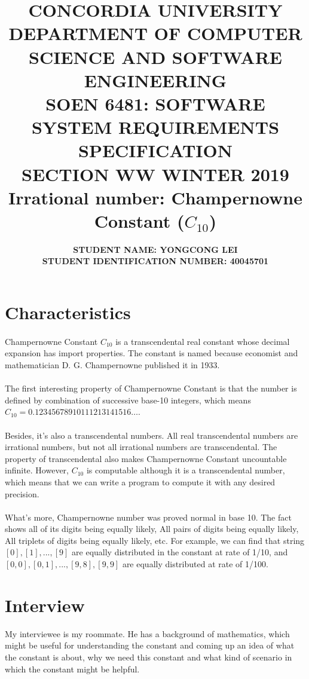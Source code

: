 \documentclass[10pt]{article}
\title{{\large \textbf{CONCORDIA UNIVERSITY \\ DEPARTMENT OF COMPUTER SCIENCE AND SOFTWARE ENGINEERING \\ SOEN 6481: SOFTWARE SYSTEM REQUIREMENTS SPECIFICATION \\ SECTION WW WINTER 2019 \\ Irrational number: Champernowne Constant ($C_{10}$)}  \\ }}
\author{\normalsize \textbf {STUDENT NAME: YONGCONG LEI} \\ \normalsize \textbf{STUDENT IDENTIFICATION NUMBER: 40045701 }}
\date{}
\begin{document}
\maketitle

\section{Characteristics}
\paragraph{}
Champernowne Constant $C_{10}$ is a transcendental real constant whose decimal expansion has import properties. The constant is named because economist and mathematician D. G. Champernowne published it in 1933.

\paragraph{}
The first interesting property of Champernowne Constant is that the number is defined by combination of successive base-10 integers, which means $C_{10} = 0.12345678910111213141516…$.

\paragraph{}
Besides, it's also a transcendental numbers. All real transcendental numbers are irrational numbers, but not all irrational numbers are transcendental. The property of transcendental also makes Champernowne Constant uncountable infinite. However, $C_{10}$ is computable  although it is a transcendental number, which means that we can write a program to compute it with any desired precision.

\paragraph{}
What's more, Champernowne number was proved normal in base 10. The fact shows all of its digits being equally likely, All pairs of digits being equally likely, All triplets of digits being equally likely, etc. For example, we can find that string $[0], [1], ..., [9]$ are equally distributed in the constant at rate of 1/10, and $ [0,0],[0,1],...,[9,8],[9,9]$ are equally distributed at rate of 1/100.

\pagebreak
\section{Interview}
My interviewee is my roommate. He has a background of mathematics, which might be useful for understanding the constant and coming up an idea of what the constant is about, why we need this constant and what kind of scenario in which the constant might be helpful.
\end{document}
